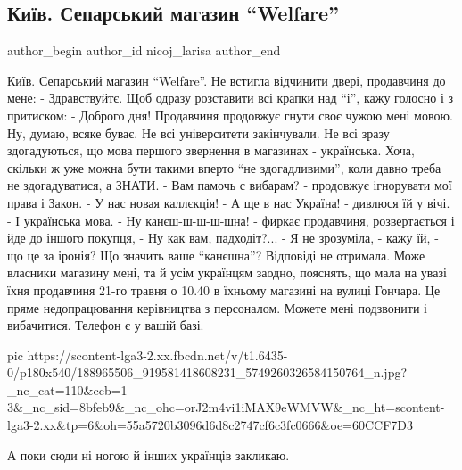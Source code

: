  
 
 
 
 
 
\subsection{Київ. Сепарський магазин \enquote{Welfаre}}
\label{sec:21_05_2021.fb.nicoj_larisa.2.kiev_magazin_welfare_mova}
\ifcmt
 author_begin
   author_id nicoj_larisa
 author_end
\fi

\obeycr
Київ. Сепарський магазин \enquote{Welfаre}.
Не встигла відчинити двері, продавчиня до мене:
- Здравствуйтє.
Щоб одразу розставити всі крапки над \enquote{і}, кажу голосно і з притиском:
- Доброго дня!
Продавчиня продовжує гнути своє чужою мені мовою. Ну, думаю, всяке буває. Не
всі університети закінчували. Не всі зразу здогадуються, що мова першого
звернення в магазинах - українська. Хоча, скільки ж уже можна бути такими
вперто \enquote{не здогадливими}, коли давно треба не здогадуватися, а ЗНАТИ.
- Вам памочь с вибарам? - продовжує ігнорувати мої права і Закон. - У нас новая каллєкція! 
- А ще в нас Україна! - дивлюся їй у вічі. - І українська мова.
- Ну канєш-ш-ш-ш-шна! - фиркає продавчиня, розвертається і йде до іншого покупця, - Ну как вам, падходіт?...
- Я не зрозуміла, - кажу їй, - що це за іронія? Що значить ваше \enquote{канєшна}? 
Відповіді не отримала. Може власники магазину мені, та й усім українцям заодно,
пояснять, що мала на увазі їхня продавчиня 21-го травня о 10.40 в їхньому
магазині на вулиці Гончара. Це пряме недопрацювання керівництва з персоналом.
Можете мені подзвонити і вибачитися. Телефон є у вашій базі. 
\restorecr

\ifcmt
  pic https://scontent-lga3-2.xx.fbcdn.net/v/t1.6435-0/p180x540/188965506_919581418608231_5749260326584150764_n.jpg?_nc_cat=110&ccb=1-3&_nc_sid=8bfeb9&_nc_ohc=orJ2m4vi1iMAX9eWMVW&_nc_ht=scontent-lga3-2.xx&tp=6&oh=55a5720b3096d6d8c2747cf6c3fc0666&oe=60CCF7D3
\fi

А поки сюди ні ногою й інших українців закликаю.

